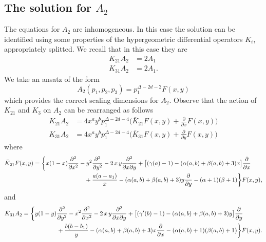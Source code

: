 \documentclass[a4paper,11pt,openright,twoside]{book}
\numberwithin{equation}{section}
\begin{document}
{{{\subsection{The solution for $A_2$}

The equations for $A_2$ are inhomogeneous. In this case the solution can be identified using some properties of the hypergeometric differential operators $K_i$, appropriately splitted. We recall that in this case they are 
\begin{align}
	K_{21}A_2 &= 2 A_1\label{inhomA2}\\
	K_{31}A_2& = 2A_1.\label{inhomA21}
\end{align}
We take an ansatz of the form 
\begin{equation}
	A_2(p_1,p_2,p_3)=p_1^{\Delta-2 d - 2}F(x,y)
\end{equation}
which provides the correct scaling dimensions for $A_2$. 
Observe that the action of $K_{21}$ and $K_{3}$ on $A_2$ can be rearranged as follows
\begin{align}
	K_{21} A_2&=4 x^a y^b p_1^{\Delta-2 d -4}\bigg( \bar{K}_{21}F(x,y) +\frac{\partial}{\partial x} F(x,y)\bigg)\\[1.5ex]
	K_{31} A_2&=4 x^a y^b p_1^{\Delta-2 d -4}\bigg( \bar{K}_{31}F(x,y) +\frac{\partial}{\partial y} F(x,y)\bigg)
\end{align}
where
\begin{align}
	\label{k1barA2}
	\bar{K}_{21}F(x,y)&=\bigg\{x(1-x) \frac{\partial^2}{\partial x^2} - y^2 \frac{\partial^2}{\partial y^2} - 2 \, x \, y \frac{\partial^2}{\partial x \partial y} +\big[  (\gamma(a)-1) - (\alpha(a,b) + \beta(a,b) + 3) x \big] \frac{\partial}{\partial x}\notag\\
	&\hspace{3cm}
	+ \frac{a (a-a_1)}{x} - (\alpha(a,b) + \beta(a,b) + 3) y \frac{\partial}{\partial y}  - (\alpha +1)(\beta +1) \bigg\} F(x,y),
\end{align}
and 
\begin{align}
	\label{k2barA2}
	\bar{K}_{31} A_2&=\bigg\{ y(1-y) \frac{\partial^2}{\partial y^2} - x^2 \frac{\partial^2}{\partial x^2} - 2 \, x \, y \frac{\partial^2}{\partial x \partial y} +  \big[ (\gamma'(b)-1)- (\alpha(a,b) + \beta(a,b) + 3) y \big]\frac{\partial}{\partial y}\notag\\
	&\hspace{2cm} +  \frac{b(b- b_1)}{y} - (\alpha(a,b) + \beta(a,b) + 3) x \frac{\partial}{\partial x}  -(\alpha(a,b) +1)(\beta(a,b) +1)\bigg\} F(x,y).
\end{align}
}}}
\end{document}
